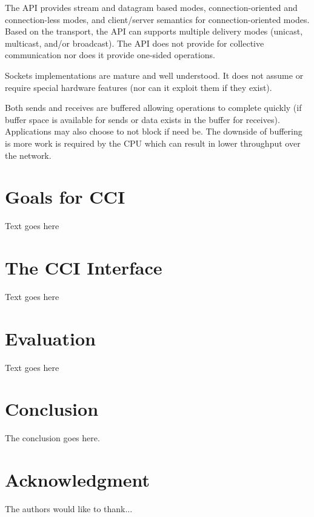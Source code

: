 \documentclass[conference]{IEEEtran}
\begin{document}
The API provides stream and datagram based modes, connection-oriented and connection-less
modes, and client/server semantics for connection-oriented modes. Based on the transport,
the API can supports multiple delivery modes (unicast, multicast, and/or broadcast). The
API does not provide for collective communication nor does it provide one-sided
operations.

Sockets implementations are mature and well understood. It does not assume or require
special hardware features (nor can it exploit them if they exist).

Both sends and receives are buffered allowing operations to complete quickly (if buffer
space is available for sends or data exists in the buffer for receives). Applications may
also choose to not block if need be. The downside of buffering is more work is required by
the CPU which can result in lower throughput over the network.

\section{Goals for CCI}
Text goes here

\section{The CCI Interface}
Text goes here

\section{Evaluation}
Text goes here

\section{Conclusion}
The conclusion goes here.


\section*{Acknowledgment}

The authors would like to thank...


\end{document}
